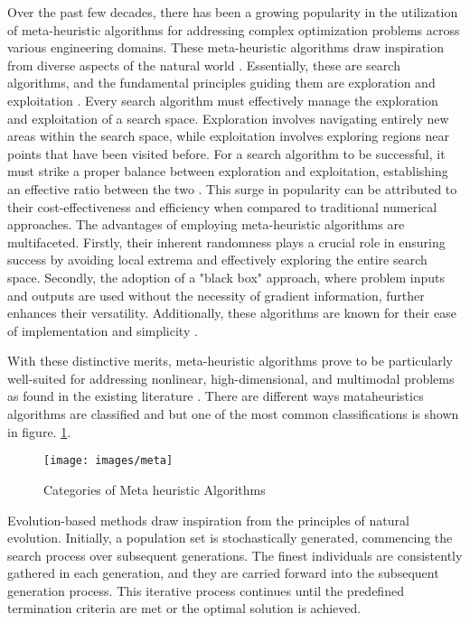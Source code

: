 \documentclass[conference]{IEEEtran}
\begin{document}
\begin{abstract1}
Over the past few decades, there has been a growing popularity in the utilization of meta-heuristic algorithms for addressing complex optimization problems across various engineering domains. These meta-heuristic algorithms draw inspiration from diverse aspects of the natural world \cite{beheshti2013review}. 
Essentially, these are search algorithms, and the fundamental principles guiding them are exploration and exploitation \cite{Ullah2023} \cite{zhao2008genetic}. Every search algorithm must effectively manage the exploration and exploitation of a search space. Exploration involves navigating entirely new areas within the search space, while exploitation involves exploring regions near points that have been visited before. For a search algorithm to be successful, it must strike a proper balance between exploration and exploitation, establishing an effective ratio between the two \cite{Eiben1998} \cite{Crepinsek2013}.
This surge in popularity can be attributed to their cost-effectiveness and efficiency when compared to traditional numerical approaches. The advantages of employing meta-heuristic algorithms are multifaceted. Firstly, their inherent randomness plays a crucial role in ensuring success by avoiding local extrema and effectively exploring the entire search space. Secondly, the adoption of a "black box" approach, where problem inputs and outputs are used without the necessity of gradient information, further enhances their versatility. Additionally, these algorithms are known for their ease of implementation and simplicity \cite{Abualigah2021,rajakumar2016survey }.


With these distinctive merits, meta-heuristic algorithms prove to be particularly well-suited for addressing nonlinear, high-dimensional, and multimodal problems as found in the existing literature \cite{masdari2020discrete} \cite{barshandeh2021new} \cite{dhiman2019stoa} \cite{siarry2016metaheuristics}. There are different ways mataheuristics algorithms are classified \cite{bhattacharyya2020mayfly} and \cite{kumar2020comparative} but one of the most common classifications is shown in figure. \ref{GA}.
\begin{figure}[htbp]
	\centerline{\texttt{[image: images/meta]}}
	\caption{Categories of Meta heuristic Algorithms}
	\label{GA}
\end{figure}


Evolution-based methods \cite{Mirjalili2016,Kar2016} draw inspiration from the principles of natural evolution. Initially, a population set is stochastically generated, commencing the search process over subsequent generations. The finest individuals are consistently gathered in each generation, and they are carried forward into the subsequent generation process. This iterative process continues until the predefined termination criteria are met or the optimal solution is achieved.


\end{abstract1}
\end{document}
